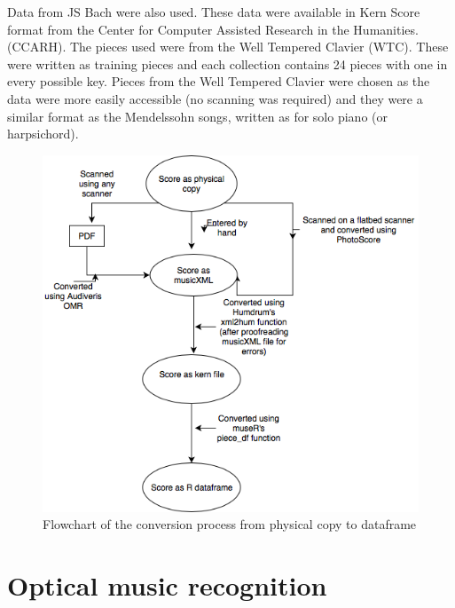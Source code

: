 \documentclass[12pt,twoside]{reedthesis}
\theoremstyle{definition}
\theoremstyle{definition}
\theoremstyle{definition}
\theoremstyle{remark}
\begin{document}
Data from JS Bach were also used. These data were available in Kern
Score format from the Center for Computer Assisted Research in the
Humanities. (CCARH). The pieces used were from the Well Tempered Clavier
(WTC). These were written as training pieces and each collection
contains 24 pieces with one in every possible key. Pieces from the Well
Tempered Clavier were chosen as the data were more easily accessible (no
scanning was required) and they were a similar format as the Mendelssohn
songs, written as for solo piano (or harpsichord).
\begin{figure}[h]
\centering
\includegraphics[scale = .5]{images/test.png}
\caption{Flowchart of the conversion process from physical copy to dataframe}
\label{subd}
\end{figure}
\section{Optical music recognition}\label{optical-music-recognition}
\end{document}

